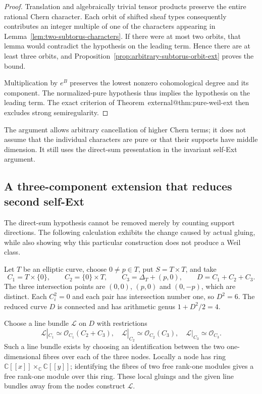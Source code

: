 \documentclass[11pt]{article}
\makeatletter
\providecommand{\compref}[1]{\csname external@#1\endcsname}
\theoremstyle{definition}
\theoremstyle{remark}
\makeatother
\begin{document}
\begin{proof}
Translation and algebraically trivial tensor products preserve
the entire rational Chern character.  Each orbit of shifted
sheaf types consequently contributes an integer multiple of one
of the characters appearing in Lemma~\ref{lem:two-subtorus-characters}.
If there were at most two orbits, that lemma would contradict the
hypothesis on the leading term.  Hence there are at least three
orbits, and Proposition~\ref{prop:arbitrary-subtorus-orbit-ext}
proves the bound.

Multiplication by $e^B$ preserves the lowest nonzero cohomological
degree and its component.  The normalized-pure hypothesis thus
implies the hypothesis on the leading term.  The exact criterion
of Theorem~\compref{thm:pure-weil-ext} then excludes strong
semiregularity.
\end{proof}

The argument allows arbitrary cancellation of higher Chern terms;
it does not assume that the individual characters are pure or
that their supports have middle dimension.  It still uses the
direct-sum presentation in the invariant self-Ext argument.

\subsection{A three-component extension that reduces second self-Ext}
\label{subsec:three-support-extension}

The direct-sum hypothesis cannot be removed merely by counting
support directions.  The following calculation exhibits the
change caused by actual gluing, while also showing why this
particular construction does not produce a Weil class.

Let $T$ be an elliptic curve, choose $0\ne p\in T$, put
$S=T\times T$, and take
\[
 C_1=T\times\{0\},\qquad
 C_2=\{0\}\times T,\qquad
 C_3=\Delta_T+(p,0),
 \qquad D=C_1+C_2+C_3.
\]
The three intersection points are $(0,0)$, $(p,0)$ and $(0,-p)$,
which are distinct.  Each $C_i^2=0$ and each pair has intersection number one, so
$D^2=6$.  The reduced curve $D$ is connected and has arithmetic
genus $1+D^2/2=4$.

Choose a line bundle $\mathcal L$ on $D$ with restrictions
\[
 \mathcal L|_{C_1}\simeq\mathcal O_{C_1}(C_2+C_3),\quad
 \mathcal L|_{C_2}\simeq\mathcal O_{C_2}(C_3),\quad
 \mathcal L|_{C_3}\simeq\mathcal O_{C_3}.
\]
Such a line bundle exists by choosing an identification between
the two one-dimensional fibres over each of the three nodes.
Locally a node has ring
$\mathbb C[[x]]\times_{\mathbb C}\mathbb C[[y]]$;
identifying the fibres of two free rank-one modules gives a free
rank-one module over this ring.  These local gluings and the
given line bundles away from the nodes construct $\mathcal L$.
\end{document}

